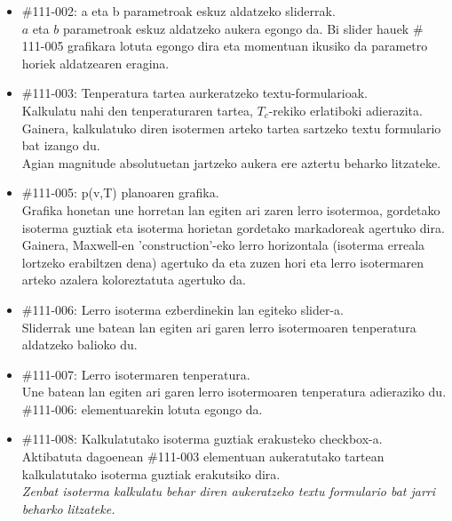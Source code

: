 \documentclass[10pt,a4paper]{article}
\let\nf\normalfont %
\newcommand{\cf}{\normalfont\sffamily}
\begin{document}
\begin{itemize}

\item \cf \#111-002: a eta b parametroak eskuz aldatzeko sliderrak.
\\
\nf $a$ eta $b$ parametroak eskuz aldatzeko aukera egongo da. Bi slider hauek \cf \# 111-005 \nf grafikara lotuta egongo dira eta
momentuan ikusiko da parametro horiek aldatzearen eragina.

\item \cf \#111-003: Tenperatura tartea aurkeratzeko textu-formularioak.
\\
\nf Kalkulatu nahi den tenperaturaren tartea, $T_c$-rekiko erlatiboki adierazita. Gainera, kalkulatuko diren isotermen arteko tartea sartzeko textu formulario bat izango du. 
\\

Agian magnitude absolutuetan jartzeko aukera ere aztertu beharko litzateke.

\item \cf \#111-005: p(v,T) planoaren grafika.
\\
\nf Grafika honetan une horretan lan egiten ari zaren lerro isotermoa, gordetako isoterma guztiak eta isoterma horietan gordetako markadoreak agertuko dira. Gainera, Maxwell-en 'construction'-eko lerro horizontala (isoterma erreala lortzeko erabiltzen dena) agertuko da eta zuzen hori eta lerro isotermaren arteko azalera koloreztatuta agertuko da.

\item \cf \#111-006: Lerro isoterma ezberdinekin lan egiteko slider-a.
\\
\nf Sliderrak une batean lan egiten ari garen lerro isotermoaren tenperatura aldatzeko balioko du.

\item \cf \#111-007: Lerro isotermaren tenperatura.
\\
\nf Une batean lan egiten ari garen lerro isotermoaren tenperatura adieraziko du. \cf \#111-006: \nf elementuarekin lotuta egongo da.

\item \cf \#111-008: Kalkulatutako isoterma guztiak erakusteko checkbox-a.
\\
\nf Aktibatuta dagoenean \cf \#111-003 \nf elementuan aukeratutako tartean kalkulatutako isoterma guztiak erakutsiko dira.
\\

\textit{Zenbat isoterma kalkulatu behar diren aukeratzeko textu formulario bat jarri beharko litzateke.}


\end{itemize}
\end{document}
